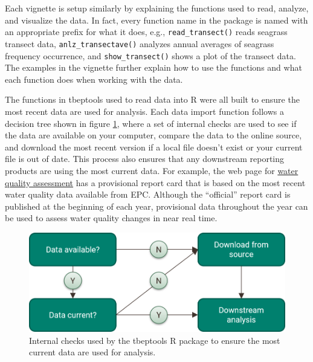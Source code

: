 \documentclass[
]{book}
\begin{document}
Each vignette is setup similarly by explaining the functions used to read, analyze, and visualize the data. In fact, every function name in the package is named with an appropriate prefix for what it does, e.g., \texttt{read\_transect()} reads seagrass transect data, \texttt{anlz\_transectave()} analyzes annual averages of seagrass frequency occurrence, and \texttt{show\_transect()} shows a plot of the transect data. The examples in the vignette further explain how to use the functions and what each function does when working with the data.

The functions in tbeptools used to read data into R were all built to ensure the most recent data are used for analysis. Each data import function follows a decision tree shown in figure \ref{fig:readchk}, where a set of internal checks are used to see if the data are available on your computer, compare the data to the online source, and download the most recent version if a local file doesn't exist or your current file is out of date. This process also ensures that any downstream reporting products are using the most current data. For example, the web page for \href{https://tbep.org/water-quality-report-card/}{water quality assessment} has a provisional report card that is based on the most recent water quality data available from EPC. Although the ``official'' report card is published at the beginning of each year, provisional data throughout the year can be used to assess water quality changes in near real time.

\begin{figure}

{\centering \includegraphics[width=0.8\linewidth]{img/readchk} 

}

\caption{Internal checks used by the tbeptools R package to ensure the most current data are used for analysis.}\label{fig:readchk}
\end{figure}
\end{document}
